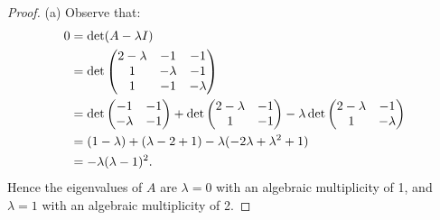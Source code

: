 \documentclass[10pt,twoside,openany]{memoir}
\begin{document}
    {\color{blue} \begin{proof}
        (a) Observe that:
            \begin{equation*}
            \begin{split}
                0 
                & = \det(A - \lambda I) \\
                & = \det \left( \begin{matrix} 2-\lambda & -1 & -1 \\ 1 & -\lambda & -1 \\ 1 & -1 & -\lambda \end{matrix} \right) \\
                & = \det \left( \begin{matrix} -1 & -1 \\ -\lambda & - 1 \end{matrix} \right) + \det\left( \begin{matrix} 2-\lambda & -1 \\ 1 & -1 \end{matrix} \right) - \lambda \det \left( \begin{matrix} 2-\lambda & -1 \\ 1 & -\lambda \end{matrix} \right) \\
                & = (1-\lambda) + (\lambda -2 + 1) -\lambda(-2\lambda + \lambda^2 + 1) \\
                & = -\lambda(\lambda-1)^2.
            \end{split}
            \end{equation*}
        Hence the eigenvalues of $A$ are $\lambda = 0$ with an algebraic multiplicity of 1, and $\lambda = 1$ with an algebraic multiplicity of 2.


\end{proof}}
\end{document}
